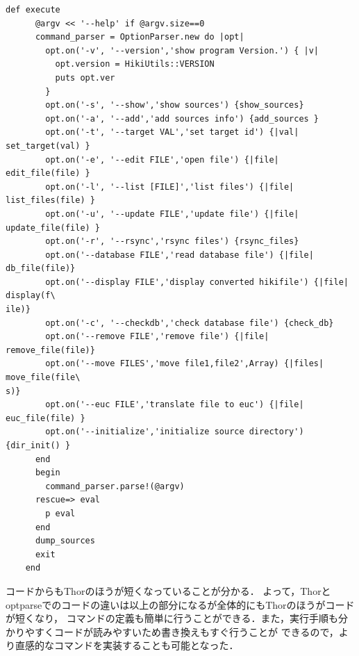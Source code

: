\begin{lstlisting}[style=customRuby]
    def execute
      @argv << '--help' if @argv.size==0
      command_parser = OptionParser.new do |opt|
        opt.on('-v', '--version','show program Version.') { |v|
          opt.version = HikiUtils::VERSION
          puts opt.ver
        }
        opt.on('-s', '--show','show sources') {show_sources}
        opt.on('-a', '--add','add sources info') {add_sources }
        opt.on('-t', '--target VAL','set target id') {|val| set_target(val) }
        opt.on('-e', '--edit FILE','open file') {|file| edit_file(file) }
        opt.on('-l', '--list [FILE]','list files') {|file| list_files(file) }
        opt.on('-u', '--update FILE','update file') {|file| update_file(file) }
        opt.on('-r', '--rsync','rsync files') {rsync_files}
        opt.on('--database FILE','read database file') {|file| db_file(file)}
        opt.on('--display FILE','display converted hikifile') {|file| display(f\
ile)}
        opt.on('-c', '--checkdb','check database file') {check_db}
        opt.on('--remove FILE','remove file') {|file| remove_file(file)}
        opt.on('--move FILES','move file1,file2',Array) {|files| move_file(file\
s)}
        opt.on('--euc FILE','translate file to euc') {|file| euc_file(file) }
        opt.on('--initialize','initialize source directory') {dir_init() }
      end
      begin
        command_parser.parse!(@argv)
      rescue=> eval
        p eval
      end
      dump_sources
      exit
    end  
\end{lstlisting}
コードからもThorのほうが短くなっていることが分かる．
よって，Thorとoptparseでのコードの違いは以上の部分になるが全体的にもThorのほうがコードが短くなり，
コマンドの定義も簡単に行うことができる．また，実行手順も分かりやすくコードが読みやすいため書き換えもすぐ行うことが
できるので，より直感的なコマンドを実装することも可能となった．

